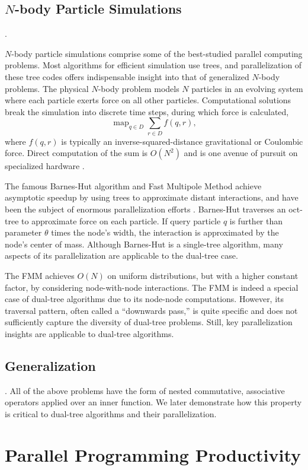 \documentclass[twoside,leqno,twocolumn]{article}
\DeclareMathOperator*{\map}{map}
\newcommand{\mysub}[1]{\subsection{#1}. }
\begin{document}
\mysub{$N$-body Particle Simulations}

$N$-body particle simulations comprise some of the best-studied parallel computing problems.
Most algorithms for efficient simulation use trees, and parallelization of these tree codes offers indispensable insight into that of generalized $N$-body problems.
The physical $N$-body problem models $N$ particles in an evolving system where each particle exerts force on all other particles.
Computational solutions break the simulation into discrete time steps, during which force is calculated,
\[\map_{q \in D} \sum_{r \in D} f(q,r),\]
\noindent where $f(q,r)$ is typically an inverse-squared-distance gravitational or Coulombic force.
Direct computation of the sum is $O(N^2)$ and is one avenue of pursuit on specialized hardware \cite{grape}.

The famous Barnes-Hut algorithm \cite{barnes_hut} and Fast Multipole Method \cite{greengard_fmm} achieve asymptotic speedup by using trees to approximate distant interactions, and have been the subject of enormous parallelization efforts \cite{singh_thesis, salmon_thesis, liu94experiences, salmon97parallel,singh92implications, singh95load, warren95portable}.
Barnes-Hut \cite{barnes_hut} traverses an oct-tree to approximate force on each particle.
If query particle $q$ is further than parameter $\theta$ times the node's width, the interaction is approximated by the node's center of mass.
Although Barnes-Hut is a single-tree algorithm, many aspects of its parallelization are applicable to the dual-tree case.

The FMM \cite{greengard_fmm} achieves $O(N)$ on uniform distributions, but with a higher constant factor, by considering node-with-node interactions.
The FMM is indeed a special case of dual-tree algorithms due to its node-node computations.
However, its traversal pattern, often called a ``downwards pass,'' is quite specific and does not sufficiently capture the diversity of dual-tree problems.
Still, key parallelization insights are applicable to dual-tree algorithms.

\mysub{Generalization}
All of the above problems have the form of nested commutative, associative operators applied over an inner function.
We later demonstrate how this property is critical to dual-tree algorithms and their parallelization.


\section{Parallel Programming Productivity}
\end{document}
